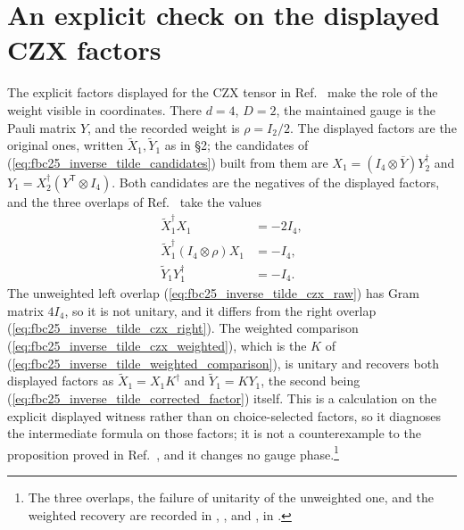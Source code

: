 \documentclass{article}
\begin{document}
\section{An explicit check on the displayed CZX factors}

The explicit factors displayed for the CZX tensor in
Ref.~\cite[lines~4559--4659]{FrancoRubio2025MPUGauging} make the role of the weight visible in coordinates. There $d=4$, $D=2$, the maintained gauge is the Pauli matrix $Y$, and the recorded weight is $\rho=I_2/2$. The displayed factors are the original ones, written $\widetilde X_1,\widetilde Y_1$ as in §2; the candidates of
(\ref{eq:fbc25_inverse_tilde_candidates}) built from them are
$X_1=(I_4\otimes\overline Y)Y_2^\dagger$ and
$Y_1=X_2^\dagger(Y^{\mathsf T}\otimes I_4)$.
Both candidates are the negatives of the displayed factors, and the three overlaps of
Ref.~\cite[lines~5438--5441]{FrancoRubio2025MPUGauging} take the values
\begin{align}
    \widetilde X_1^\dagger X_1                 & =-2I_4,
    \label{eq:fbc25_inverse_tilde_czx_raw}               \\
    \widetilde X_1^\dagger(I_4\otimes\rho)X_1  & =-I_4,
    \label{eq:fbc25_inverse_tilde_czx_weighted}          \\
    \widetilde Y_1Y_1^\dagger                  & =-I_4.
    \label{eq:fbc25_inverse_tilde_czx_right}
\end{align}
The unweighted left overlap (\ref{eq:fbc25_inverse_tilde_czx_raw}) has Gram matrix $4I_4$, so it is not unitary, and it differs from the right overlap
(\ref{eq:fbc25_inverse_tilde_czx_right}). The weighted comparison
(\ref{eq:fbc25_inverse_tilde_czx_weighted}), which is the $K$ of
(\ref{eq:fbc25_inverse_tilde_weighted_comparison}), is unitary and recovers both displayed factors as $\widetilde X_1=X_1K^\dagger$ and $\widetilde Y_1=KY_1$, the second being
(\ref{eq:fbc25_inverse_tilde_corrected_factor}) itself.
This is a calculation on the explicit displayed witness rather than on choice-selected factors, so it diagnoses the intermediate formula on those factors; it is not a counterexample to the proposition proved in
Ref.~\cite[lines~5350--5487]{FrancoRubio2025MPUGauging}, and it changes no gauge phase.\footnote{The three overlaps, the failure of unitarity of the unweighted one, and the weighted recovery are recorded in
    ,
    , and
    , in
    .}
\end{document}
